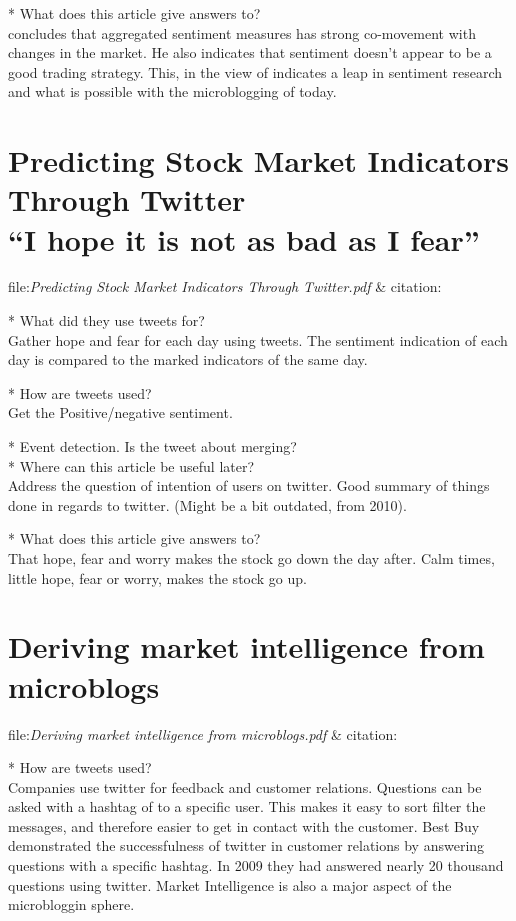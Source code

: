 * What does this article give answers to?\\
\cite[p]{Brown20041} concludes that aggregated sentiment measures has strong
co-movement with changes in the market. He also indicates that sentiment
doesn't appear to be a good trading strategy. This, in the view of
\cite[]{Zhang201155} indicates a leap in sentiment research and what is possible
with the microblogging of today. 

\section{Predicting Stock Market Indicators Through Twitter\\ “I hope it is not as bad as I fear”}
file:\textit{Predicting Stock Market Indicators Through Twitter.pdf} & citation:\cite[]{Zhang201155}

* What did they use tweets for?\\
Gather hope and fear for each day using tweets. 
The sentiment indication of each day is compared to the marked indicators of
the same day. 

* How are tweets used?\\
Get the Positive/negative sentiment. 

* Event detection. Is the tweet about merging? \\
* Where can this article be useful later? \\
Address the question of intention of users on twitter. 
Good summary of things done in regards to twitter. (Might be a bit outdated,
from 2010). 

* What does this article give answers to?\\
That hope, fear and worry makes the stock go down the day after. Calm times,
little hope, fear or worry, makes the stock go up. 


\section{Deriving market intelligence from microblogs}
file:\textit{Deriving market intelligence from microblogs.pdf} & citation:\cite[]{Li2013206}

* How are tweets used?\\
Companies use twitter for feedback and customer relations. Questions can be
asked with a hashtag of to a specific user. This makes it easy to sort filter
the messages, and therefore easier to get in contact with the customer. Best
Buy demonstrated the successfulness of twitter in customer relations by
answering questions with a specific hashtag. In 2009 they had answered nearly
20 thousand questions using twitter. \cite[p1]{Li2013206}
Market Intelligence is also a major aspect of the microbloggin sphere. 

